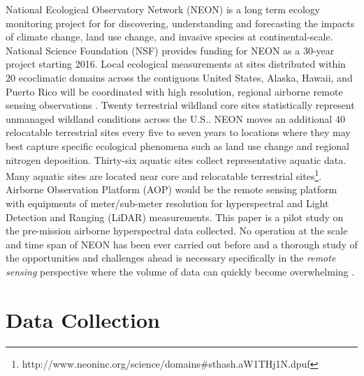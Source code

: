 \documentclass[remotesensing,article,accept,moreauthors,pdftex,12pt,a4paper]{mdpi}
\begin{document}
National Ecological Observatory Network (NEON) is a long term ecology monitoring project for for discovering, understanding and forecasting the impacts of climate change, land use change, and invasive species at continental-scale. National Science Foundation (NSF) provides funding for NEON as a 30-year project starting 2016. Local ecological measurements at sites distributed within 20 ecoclimatic domains across the contiguous United States, Alaska, Hawaii, and Puerto Rico will be coordinated with high resolution, regional airborne remote sensing observations \cite{kampe2010neon}. Twenty terrestrial wildland core sites statistically represent unmanaged wildland conditions across the U.S.. NEON moves an additional 40 relocatable terrestrial sites every five to seven years to locations where they may best capture specific ecological phenomena such as land use change and regional nitrogen deposition. Thirty-six aquatic sites collect representative aquatic data. Many aquatic sites are located near core and relocatable terrestrial sites\footnote{http://www.neoninc.org/science/domains\#sthash.aW1THj1N.dpuf}. Airborne Observation Platform (AOP) would be the remote sensing platform with equipments of meter/sub-meter resolution for hyperspectral and Light Detection and Ranging (LiDAR) measurements. This paper is a pilot study on the pre-mission airborne hyperspectral data collected. No operation at the scale and time span of NEON has been ever carried out before and a thorough study of the opportunities and challenges ahead is necessary specifically in the \textit{remote sensing} perspective where the volume of data can quickly become overwhelming \cite{neon2010aopdatarelease}.

\section{Data Collection}
\end{document}
